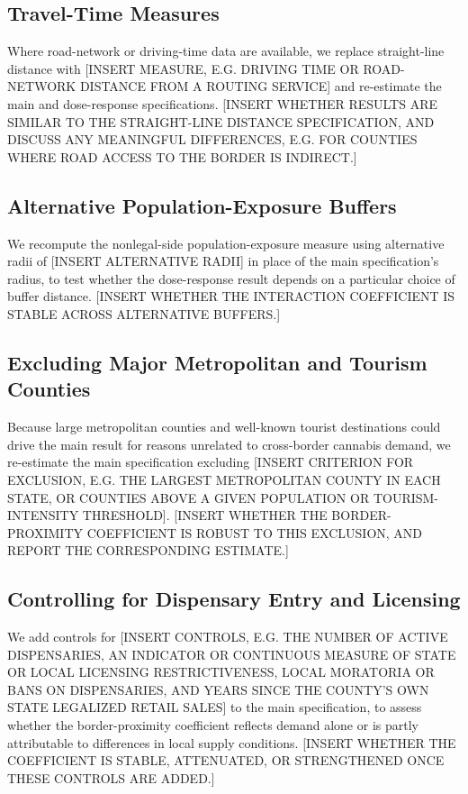 \documentclass[12pt]{article}
\begin{document}
\subsection{Travel-Time Measures}
Where road-network or driving-time data are available, we replace straight-line distance with [INSERT
MEASURE, E.G. DRIVING TIME OR ROAD-NETWORK DISTANCE FROM A ROUTING SERVICE] and re-estimate the main and
dose-response specifications. [INSERT WHETHER RESULTS ARE SIMILAR TO THE STRAIGHT-LINE DISTANCE
SPECIFICATION, AND DISCUSS ANY MEANINGFUL DIFFERENCES, E.G. FOR COUNTIES WHERE ROAD ACCESS TO THE BORDER IS
INDIRECT.]

\subsection{Alternative Population-Exposure Buffers}
We recompute the nonlegal-side population-exposure measure using alternative radii of [INSERT ALTERNATIVE
RADII] in place of the main specification's radius, to test whether the dose-response result depends on a
particular choice of buffer distance. [INSERT WHETHER THE INTERACTION COEFFICIENT IS STABLE ACROSS
ALTERNATIVE BUFFERS.]

\subsection{Excluding Major Metropolitan and Tourism Counties}
Because large metropolitan counties and well-known tourist destinations could drive the main result for
reasons unrelated to cross-border cannabis demand, we re-estimate the main specification excluding [INSERT
CRITERION FOR EXCLUSION, E.G. THE LARGEST METROPOLITAN COUNTY IN EACH STATE, OR COUNTIES ABOVE A GIVEN
POPULATION OR TOURISM-INTENSITY THRESHOLD]. [INSERT WHETHER THE BORDER-PROXIMITY COEFFICIENT IS ROBUST TO
THIS EXCLUSION, AND REPORT THE CORRESPONDING ESTIMATE.]

\subsection{Controlling for Dispensary Entry and Licensing}
We add controls for [INSERT CONTROLS, E.G. THE NUMBER OF ACTIVE DISPENSARIES, AN INDICATOR OR CONTINUOUS
MEASURE OF STATE OR LOCAL LICENSING RESTRICTIVENESS, LOCAL MORATORIA OR BANS ON DISPENSARIES, AND YEARS
SINCE THE COUNTY'S OWN STATE LEGALIZED RETAIL SALES] to the main specification, to assess whether the
border-proximity coefficient reflects demand alone or is partly attributable to differences in local supply
conditions. [INSERT WHETHER THE COEFFICIENT IS STABLE, ATTENUATED, OR STRENGTHENED ONCE THESE CONTROLS ARE
ADDED.]
\end{document}
